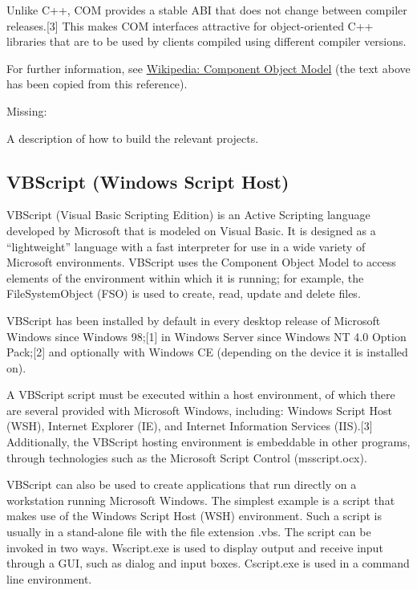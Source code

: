 \vpara
Unlike C++, COM provides a stable ABI that does not change between compiler releases.[3] This makes COM interfaces attractive for object-oriented C++ libraries that are to be used by clients compiled using different compiler versions.

\vpara
For further information, see \href{http://en.wikipedia.org/wiki/Component_Object_Model}{Wikipedia: Component Object Model} (the text above has been copied from this reference).

\vpara
Missing:

A description of how to build the relevant projects.




\newpage
\subsection{VBScript (Windows Script Host)}
VBScript (Visual Basic Scripting Edition) is an Active Scripting language developed by Microsoft that is modeled on Visual Basic. It is designed as a “lightweight” language with a fast interpreter for use in a wide variety of Microsoft environments. VBScript uses the Component Object Model to access elements of the environment within which it is running; for example, the FileSystemObject (FSO) is used to create, read, update and delete files.

\vpara
VBScript has been installed by default in every desktop release of Microsoft Windows since Windows 98;[1] in Windows Server since Windows NT 4.0 Option Pack;[2] and optionally with Windows CE (depending on the device it is installed on).

\vpara
A VBScript script must be executed within a host environment, of which there are several provided with Microsoft Windows, including: Windows Script Host (WSH), Internet Explorer (IE), and Internet Information Services (IIS).[3] Additionally, the VBScript hosting environment is embeddable in other programs, through technologies such as the Microsoft Script Control (msscript.ocx).

\vpara
VBScript can also be used to create applications that run directly on a workstation running Microsoft Windows. The simplest example is a script that makes use of the Windows Script Host (WSH) environment. Such a script is usually in a stand-alone file with the file extension .vbs. The script can be invoked in two ways. Wscript.exe is used to display output and receive input through a GUI, such as dialog and input boxes. Cscript.exe is used in a command line environment.

